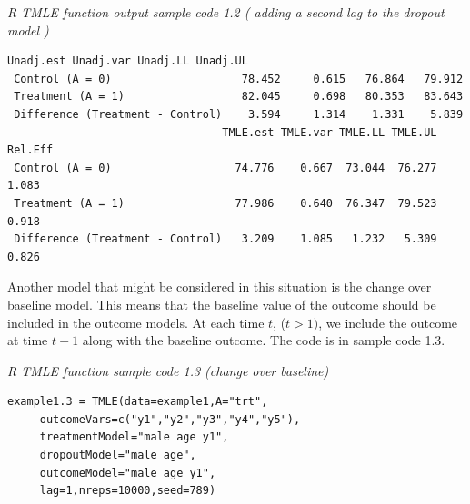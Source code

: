 \documentclass[10pt]{article}
\renewcommand{\baselinestretch}{1.3}
\begin{document}
\begin{minipage}{\textwidth}
\renewcommand{\baselinestretch}{1.0}\selectfont%
\begin{minipage}[l]{5.6in}
\normalsize\em%
R TMLE function output sample code 1.2 ( adding a second lag to the dropout model )
\end{minipage}\vspace{-0.08in}
\begin{Verbatim}[baselinestretch=1.0, fontsize=\small, frame=single, commandchars=\\\{\}]
                                 Unadj.est Unadj.var Unadj.LL Unadj.UL
 Control (A = 0)                    78.452     0.615   76.864   79.912
 Treatment (A = 1)                  82.045     0.698   80.353   83.643
 Difference (Treatment - Control)    3.594     1.314    1.331    5.839
                                 TMLE.est TMLE.var TMLE.LL TMLE.UL Rel.Eff
 Control (A = 0)                   74.776    0.667  73.044  76.277   1.083
 Treatment (A = 1)                 77.986    0.640  76.347  79.523   0.918
 Difference (Treatment - Control)   3.209    1.085   1.232   5.309   0.826
\end{Verbatim}
\end{minipage}
\vspace{0.2in}
\newpage
Another model that might be considered in this situation is the change over baseline model.  This means that the baseline value of the outcome should be included in the outcome models. At each time $t$, ($t > 1)$, we include  the outcome at time $t-1$ along with the baseline outcome.  The code is in sample code 1.3.

\vspace{0.1in}


\begin{minipage}{\textwidth}
\renewcommand{\baselinestretch}{1.0}\selectfont%
\begin{minipage}[l]{5.6in}
\normalsize\em%
R TMLE function sample code 1.3 (change over baseline)
\end{minipage}\vspace{-0.08in}
\begin{Verbatim}[baselinestretch=1.0, fontsize=\small, frame=single, commandchars=\\\{\}]
example1.3 = TMLE(data=example1,A="trt",
     outcomeVars=c("y1","y2","y3","y4","y5"),
     treatmentModel="male age y1",
     dropoutModel="male age",
     outcomeModel="male age y1",
     lag=1,nreps=10000,seed=789)
\end{Verbatim}
\end{minipage}
\vspace{0.2in}
\end{document}
